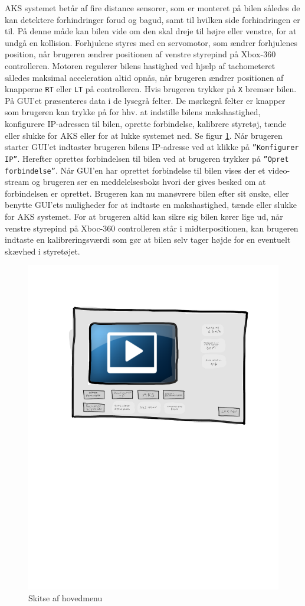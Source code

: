 AKS systemet betår af fire distance sensorer, som er monteret på bilen således de kan detektere forhindringer forud og bagud, samt til hvilken side forhindringen er til. På denne måde kan bilen vide om den skal dreje til højre eller venstre, for at undgå en kollision. Forhjulene styres med en servomotor, som ændrer forhjulenes position, når brugeren ændrer positionen af venstre styrepind på Xbox-360 controlleren. Motoren regulerer bilens hastighed ved hjælp af tachometeret således maksimal acceleration altid opnås, når brugeren ændrer positionen af knapperne \texttt{RT} eller \texttt{LT} på controlleren. Hvis brugeren trykker på \texttt{X} bremser bilen. På GUI'et præsenteres data i de lysegrå felter. De mørkegrå felter er knapper som brugeren kan trykke på for hhv. at indstille bilens makshastighed, konfigurere IP-adressen til bilen, oprette forbindelse, kalibrere styretøj, tænde eller slukke for AKS eller for at lukke systemet ned. Se figur \ref{fig:main_menu}. Når brugeren starter GUI'et indtaster brugeren bilens IP-adresse ved at klikke på \texttt{''Konfigurer IP''}. Herefter oprettes forbindelsen til bilen ved at brugeren trykker på \texttt{''Opret forbindelse''}. Når GUI'en har oprettet forbindelse til bilen vises der et video-stream og brugeren ser en meddelelsesboks hvori der gives besked om at forbindelsen er oprettet. Brugeren kan nu manøvrere bilen efter sit ønske, eller benytte GUI'ets muligheder for at indtaste en makshastighed, tænde eller slukke for AKS systemet. For at brugeren altid kan sikre sig bilen kører lige ud, når venstre styrepind på Xboc-360 controlleren står i midterpositionen, kan brugeren indtaste en kalibreringsværdi som gør at bilen selv tager højde for en eventuelt skævhed i styretøjet.

\begin{figure}[h]
\centering
\includegraphics[width=\textwidth*2/3]{../fig/gui/hovedmenu}
\caption{Skitse af hovedmenu}
\label{fig:main_menu}
\end{figure}
